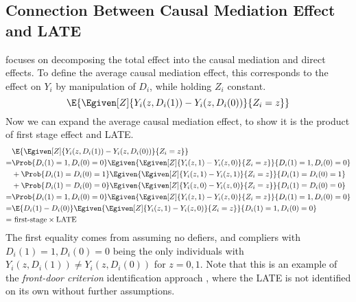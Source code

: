 \subsection{Connection Between Causal Mediation Effect and LATE}
\label{sec:acme-late}
\cite{imai2010identification} focuses on decomposing the total effect into the causal mediation and direct effects.
To define the average causal mediation effect, this corresponds to the effect on $Y_i$ by manipulation of $D_i$, while holding $Z_i$ constant.
\[ \E{ \Egiven[Z]{ Y_i(z, D_i(1)) - Y_i(z, D_i(0)) }{Z_i = z}} \]
Now we can expand the average causal mediation effect, to show it is the product of first stage effect and LATE.
\begin{align*}
    &\E{ \Egiven[Z]{ Y_i(z, D_i(1)) - Y_i(z, D_i(0)) }{Z_i = z}} \\
    =& 
    \Prob{D_i(1) = 1, D_i(0) = 0}
    \Egiven{ \Egiven[Z]{ Y_i(z, 1) - Y_i(z, 0) }{Z_i = z}}{
        D_i(1) = 1, D_i(0) = 0} \\
    & + \Prob{D_i(1) = D_i(0) = 1}
    \Egiven{ \Egiven[Z]{ Y_i(z, 1) - Y_i(z, 1) }{Z_i = z}}{
        D_i(1) = D_i(0) = 1} \\
    & + \Prob{D_i(1) = D_i(0) = 0}
    \Egiven{ \Egiven[Z]{ Y_i(z, 0) - Y_i(z, 0) }{Z_i = z}}{
        D_i(1) = D_i(0) = 0} \\
    =& \Prob{D_i(1) = 1, D_i(0) = 0}
    \Egiven{ \Egiven[Z]{ Y_i(z, 1) - Y_i(z, 0) }{Z_i = z}}{
        D_i(1) = 1, D_i(0) = 0} \\
    =& \E{D_i(1) - D_i(0)}
    \Egiven{ \Egiven[Z]{ Y_i(z, 1) - Y_i(z, 0) }{Z_i = z}}{
        D_i(1) = 1, D_i(0) = 0} \\
    =& \text{ first-stage} \times \text{LATE} \\
\end{align*}
The first equality comes from assuming no defiers, and compliers with $D_i(1) = 1, D_i(0) = 0$ being the only individuals with $Y_i(z, D_i(1)) \neq Y_i(z, D_i(0))$ for $z = 0,1$.
Note that this is an example of the \textit{front-door criterion} identification approach \citep{pearl2003direct}, where the LATE is not identified on its own without further assumptions.

